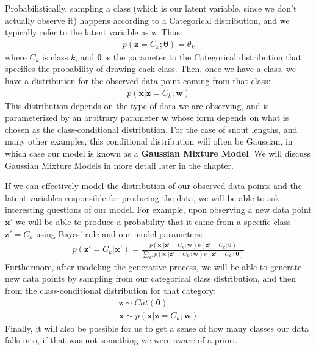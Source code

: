 Probabilistically, sampling a class (which is our latent variable, since we don't actually observe it) happens according to a Categorical distribution, and we typically refer to the latent variable as $\textbf{z}$. Thus:
\begin{align*}
    p(\textbf{z} = C_{k} ; \boldsymbol{\theta}) = \theta_{k}
\end{align*}
where $C_{k}$ is class $k$, and $\boldsymbol{\theta}$ is the parameter to the Categorical distribution that specifies the probability of drawing each class. Then, once we have a class, we have a distribution for the observed data point coming from that class:
\begin{align*}
    p(\textbf{x} | \textbf{z} = C_{k}; \textbf{w})
\end{align*}
This distribution depends on the type of data we are observing, and is parameterized by an arbitrary parameter $\textbf{w}$ whose form depends on what is chosen as the class-conditional distribution. For the case of snout lengths, and many other examples, this conditional distribution will often be Gaussian, in which case our model is known as a \textbf{Gaussian Mixture Model}. We will discuss Gaussian Mixture Models in more detail later in the chapter.

If we can effectively model the distribution of our observed data points and the latent variables responsible for producing the data, we will be able to ask interesting questions of our model. For example, upon observing a new data point $\textbf{x}'$ we will be able to produce a probability that it came from a specific class $\textbf{z}' = C_k$ using Bayes' rule and our model parameters:
\begin{align*}
    p(\textbf{z}' = C_k | \textbf{x}') = \frac{p(\textbf{x}' | \textbf{z}' = C_{k}; \textbf{w})p(\textbf{z}' = C_{k} ; \boldsymbol{\theta})}{\sum_{k'} p(\textbf{x}' | \textbf{z}' = C_{k'}; \textbf{w})p(\textbf{z}' = C_{k'} ; \boldsymbol{\theta})}
\end{align*}
Furthermore, after modeling the generative process, we will be able to generate new data points by sampling from our categorical class distribution, and then from the class-conditional distribution for that category:
\begin{align*}
    \textbf{z} \sim Cat(\boldsymbol{\theta}) \\
    \textbf{x} \sim p(\textbf{x} | \textbf{z} = C_{k}; \textbf{w})
\end{align*}
Finally, it will also be possible for us to get a sense of how many classes our data falls into, if that was not something we were aware of a priori.

